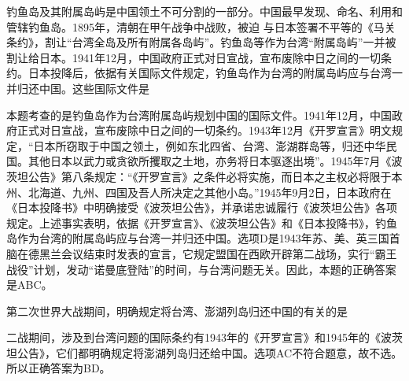 \question 钓鱼岛及其附属岛屿是中国领土不可分割的一部分。中国最早发现、命名、利用和管辖钓鱼岛。1895年，清朝在甲午战争中战败，被迫
与日本签署不平等的《马关条约》，割让``台湾全岛及所有附属各岛屿''。钓鱼岛等作为台湾``附属岛屿''一并被割让给日本。1941年12月，中国政府正式对日宣战，宣布废除中日之间的一切条约。日本投降后，依据有关国际文件规定，钓鱼岛作为台湾的附属岛屿应与台湾一并归还中国。这些国际文件是
\par{}
\begin{solution}本题考查的是钓鱼岛作为台湾附属岛屿规划中国的国际文件。1941年12月，中国政府正式对日宣战，宣布废除中日之间的一切条约。1943年12月《开罗宣言》明文规定，``日本所窃取于中国之领土，例如东北四省、台湾、澎湖群岛等，归还中华民国。其他日本以武力或贪欲所攫取之土地，亦务将日本驱逐出境''。1945年7月《波茨坦公告》第八条规定：``《开罗宣言》之条件必将实施，而日本之主权必将限于本州、北海道、九州、四国及吾人所决定之其他小岛。''1945年9月2日，日本政府在《日本投降书》中明确接受《波茨坦公告》，并承诺忠诚履行《波茨坦公告》各项规定。上述事实表明，依据《开罗宣言》、《波茨坦公告》和《日本投降书》，钓鱼岛作为台湾的附属岛屿应与台湾一并归还中国。选项D是1943年苏、美、英三国首脑在德黑兰会议结束时发表的宣言，它规定盟国在西欧开辟第二战场，实行``霸王战役''计划，发动``诺曼底登陆''的时间，与台湾问题无关。因此，本题的正确答案是ABC。
\end{solution}
\question 第二次世界大战期间，明确规定将台湾、澎湖列岛归还中国的有关的是
\par{}
\begin{solution}二战期间，涉及到台湾问题的国际条约有1943年的《开罗宣言》和1945年的《波茨坦公告》，它们都明确规定将澎湖列岛归还给中国。选项AC不符合题意，故不选。所以正确答案为BD。
\end{solution}
